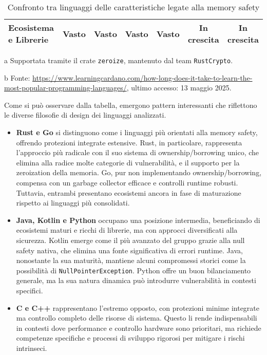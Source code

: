 \begin{table}[H]
\begin{threeparttable}
\begin{tabular}{l|c|c|c|c|c|c|}
      \textbf{Ecosistema e Librerie} & \cellcolor{green!20}Vasto     & \cellcolor{green!20}Vasto     & \cellcolor{green!20}Vasto     & \cellcolor{green!20}Vasto     & \cellcolor{yellow!20}In crescita & \cellcolor{yellow!20}In crescita \\
      \hline
    \end{tabular}
    \begin{tablenotes}
      \footnotesize \item[a] Supportata tramite il crate \texttt{zeroize}, mantenuto
      dal team \texttt{RustCrypto}. \item[b] Fonte:
      \url{https://www.learningcardano.com/how-long-does-it-take-to-learn-the-most-popular-programming-languages/},
      ultimo accesso: 13 maggio 2025.
    \end{tablenotes}
  \end{threeparttable}
  \caption{Confronto tra linguaggi delle caratteristiche legate alla memory
  safety}
  \label{tab:linguaggi_memory_safety}
\end{table}

\newpage
\noindent

Come si può osservare dalla tabella, emergono pattern interessanti che
riflettono le diverse filosofie di design dei linguaggi analizzati.

\begin{itemize}
  \item \textbf{Rust e Go} si distinguono come i linguaggi più orientati alla
    memory safety, offrendo protezioni integrate estensive. Rust, in particolare,
    rappresenta l'approccio più radicale con il suo sistema di ownership/borrowing
    unico, che elimina alla radice molte categorie di vulnerabilità, e il
    supporto per la zeroization della memoria. Go, pur non implementando
    ownership/borrowing, compensa con un garbage collector efficace e controlli runtime
    robusti. Tuttavia, entrambi presentano ecosistemi ancora in fase di maturazione
    rispetto ai linguaggi più consolidati.

  \item \textbf{Java, Kotlin e Python} occupano una posizione intermedia, beneficiando
    di ecosistemi maturi e ricchi di librerie, ma con approcci diversificati
    alla sicurezza. Kotlin emerge come il più avanzato del gruppo grazie alla null
    safety nativa, che elimina una fonte significativa di errori runtime. Java,
    nonostante la sua maturità, mantiene alcuni compromessi storici come la possibilità
    di \texttt{NullPointerException}. Python offre un buon bilanciamento generale,
    ma la sua natura dinamica può introdurre vulnerabilità in contesti specifici.

  \item \textbf{C e C++} rappresentano l'estremo opposto, con protezioni minime integrate
    ma controllo completo delle risorse di sistema. Questo li rende
    indispensabili in contesti dove performance e controllo hardware sono
    prioritari, ma richiede competenze specifiche e processi di sviluppo rigorosi
    per mitigare i rischi intrinseci.
\end{itemize}

